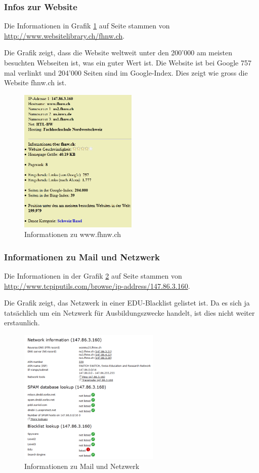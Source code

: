 \documentclass[a4paper,11pt]{scrartcl}
\begin{document}
\subsubsection{Infos zur Website}
Die Informationen in Grafik \ref{fig:website_infos} auf Seite \pageref{fig:website_infos} stammen von \url{http://www.websitelibrary.ch/fhnw.ch}.

Die Grafik zeigt, dass die Website weltweit unter den 200'000 am meisten besuchten Webseiten ist, was ein guter Wert ist. Die Website ist bei Google 757 mal verlinkt und 204'000 Seiten sind im Google-Index. Dies zeigt wie gross die Website fhnw.ch ist.
\begin{figure}[h]
	\centering
	\includegraphics[width=0.5\textwidth]{../aufg5/website_infos.png}
	\caption{Informationen zu www.fhnw.ch}
	\label{fig:website_infos}
\end{figure}

\subsubsection{Informationen zu Mail und Netzwerk}
Die Informationen in der Grafik \ref{fig:iprange_infos} auf Seite \pageref{fig:iprange_infos} stammen von \url{http://www.tcpiputils.com/browse/ip-address/147.86.3.160}.

Die Grafik zeigt, das Netzwerk in einer \glqq{}EDU-Blacklist\grqq{} gelistet ist. Da es sich ja tatsächlich um ein Netzwerk für Ausbildungszwecke handelt, ist dies nicht weiter erstaunlich.
\begin{figure}[h]
	\centering
	\includegraphics[width=0.6\textwidth]{../aufg5/iprange_infos.png}
	\caption{Informationen zu Mail und Netzwerk}
	\label{fig:iprange_infos}
\end{figure}
\end{document}
